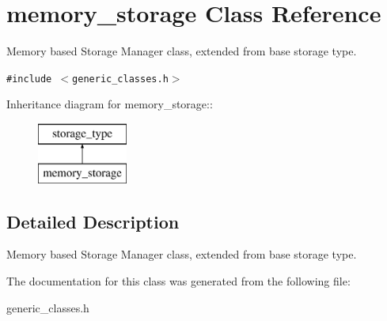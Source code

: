 \section{memory\_\-storage Class Reference}
\label{classmemory__storage}
Memory based Storage Manager class, extended from base storage type.  


{\tt \#include $<$generic\_\-classes.h$>$}

Inheritance diagram for memory\_\-storage::\begin{figure}[H]
\begin{center}
\leavevmode
\includegraphics[height=2cm]{classmemory__storage}
\end{center}
\end{figure}


\subsection{Detailed Description}
Memory based Storage Manager class, extended from base storage type. 



The documentation for this class was generated from the following file:\begin{CompactItemize}
\item 
generic\_\-classes.h\end{CompactItemize}
